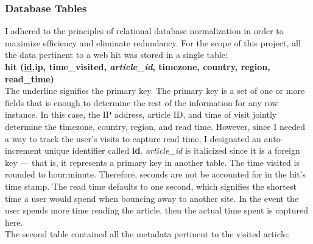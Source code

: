\documentclass[12pt]{article}
\begin{document}
\newpage

\subsubsection{Database Tables} 
I adhered to the principles of relational database normalization in order to maximize efficiency and eliminate redundancy. For the scope of this project, all the data pertinent to a web hit was stored in a single table: \\ 
{\textbf{hit (\underline{id},ip, time\_visited, \textit{article\_id}, timezone, country, region, read\_time)}} \\ 
The underline signifies the primary key. The primary key is a set of one or more fields that is enough to determine the rest of the information for any row instance. In this case, the IP address, article ID, and time of visit jointly determine the timezone, country, region, and read time. However, since I needed a way to track the user's visits to capture read time, I designated an auto-increment unique identifier called \textbf{id}. \textit{article\_id} is italicized since it is a foreign key --- that is, it represents a primary key in another table. The time visited is rounded to hour:minute. Therefore, seconds are not be accounted for in the hit's time stamp. The read time defaults to one second, which signifies the shortest time a user would spend when bouncing away to another site. In the event the user spends more time reading the article, then the actual time spent is captured here.
\\ 
The second table contained all the metadata pertinent to the visited article: 
\end{document}
